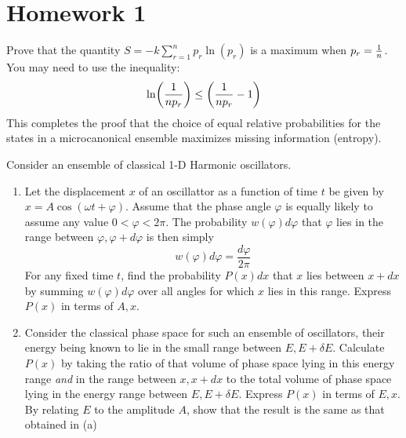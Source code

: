 \documentclass{article}
\date{Winter 2022}
\author{\EC}
\begin{document}
\maketitle
\tableofcontents
\newpage
\section{Homework 1}
    \begin{problem}
        Prove that the quantity $\displaystyle S=-k\sum_{r=1}^{n}p_r\ln(p_r)$ is a maximum when $p_r=\oo{n}$. You may need to use the inequality: $$\ln(\oo{np_r})\leq\qty(\oo{np_r}-1)$$
        This completes the proof that the choice of equal relative probabilities for the states in a microcanonical ensemble maximizes missing information (entropy).
        \answerline
    \end{problem}\newpage
    \begin{problem}[Reif 2.3]
        Consider an ensemble of classical 1-D Harmonic oscillators. 
        \begin{enumerate}[label=(\alph*)]
            \item Let the displacement $x$ of an oscillattor as a function of time $t$ be given by $x=A\cos(\omega t+\varphi)$. Assume that the phase angle $\varphi$ is equally likely to assume any value $0<\varphi<2\pi$. The probability $w(\varphi)d\varphi$ that $\varphi$ lies in the range between $\varphi,\varphi+d\varphi$ is then simply $$w(\varphi)d\varphi=\frac{d\varphi}{2\pi}$$For any fixed time $t$, find the probability $P(x)dx$ that $x$ lies between $x+dx$ by summing $w(\varphi)d\varphi$ over all angles for which $x$ lies in this range. Express $P(x)$ in terms of $A,x$. 
            \item Consider the classical phase space for such an ensemble of oscillators, their energy being known to lie in the small range between $E,E+\delta E$. Calculate $P(x)$ by taking the ratio of that volume of phase space lying in this energy range \emph{and} in the range between $x,x+dx$ to the total volume of phase space lying in the energy range between $E,E+\delta E$. Express $P(x)$ in terms of $E,x$. By relating $E$ to the amplitude $A$, show that the result is the same as that obtained in (a)
        \end{enumerate}
        \answerline
    \end{problem}\newpage
\end{document}
